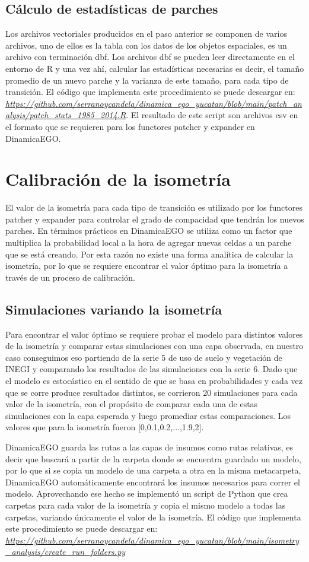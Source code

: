 \documentclass[12pt,a4paper,oldfontcommands]{article}
\begin{document}
\subsection{Cálculo de estadísticas de parches}
Los archivos vectoriales producidos en el paso anterior se componen de varios archivos, uno de ellos es la tabla con los datos de los objetos espaciales, es un archivo con terminación dbf. Los archivos dbf se pueden leer directamente en el entorno de R y una vez ahí, calcular las estadísticas necesarias es decir, el tamaño promedio de un nuevo parche y la varianza de este tamaño, para cada tipo de transición. El código que implementa este procedimiento se puede descargar en: \textit{\url{https://github.com/serranoycandela/dinamica_ego_yucatan/blob/main/patch_analysis/patch_stats_1985_2014.R}}. El resultado de este script son archivos csv en el formato que se requieren para los functores patcher y expander en DinamicaEGO.
\section{Calibración de la isometría}
El valor de la isometría para cada tipo de transición es utilizado por los functores patcher y expander para controlar el grado de compacidad que tendrán los nuevos parches. En términos prácticos en DinamicaEGO se utiliza como un factor que multiplica la probabilidad local a la hora de agregar nuevas celdas a un parche que se está creando. Por esta razón no existe una forma analítica de calcular la isometría, por lo que se requiere encontrar el valor óptimo para la isometría a través de un proceso de calibración. 
\subsection{Simulaciones variando la isometría}
Para encontrar el valor óptimo se requiere probar el modelo para distintos valores de la isometría y comparar estas simulaciones con una capa observada, en nuestro caso conseguimos eso partiendo de la serie 5 de uso de suelo y vegetación de INEGI y comparando los resultados de las simulaciones con la serie 6. Dado que el modelo es estocástico en el sentido de que se basa en probabilidades y cada vez que se corre produce resultados distintos, se corrieron 20 simulaciones para cada valor de la isometría, con el propósito de comparar cada una de estas simulaciones con la capa esperada y luego promediar estas comparaciones. Los valores que para la isometría fueron [0,0.1,0.2,...,1.9,2].

DinamicaEGO guarda las rutas a las capas de insumos como rutas relativas, es decir que buscará a partir de la carpeta donde se encuentra guardado un modelo, por lo que si se copia un modelo de una carpeta a otra en la misma metacarpeta, DinamicaEGO automáticamente encontrará los insumos necesarios para correr el modelo. Aprovechando ese hecho se implementó un script de Python que crea carpetas para cada valor de la isometría y copia el mismo modelo a todas las carpetas, variando únicamente el valor de la isometría. El código que implementa este procedimiento se puede descargar en: \textit{\url{https://github.com/serranoycandela/dinamica_ego_yucatan/blob/main/isometry_analysis/create_run_folders.py}}
\end{document}
